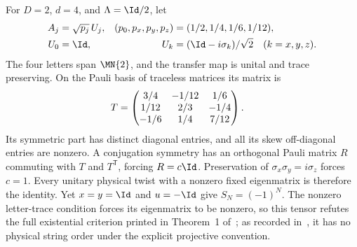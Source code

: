 \begin{example}
    \label{ex:string_order_scalar_phase_tensor}
    \leanok
    For $D=2$, $d=4$, and $\Lambda=\Id/2$, let
    \begin{align}
        A_j & =\sqrt{p_j}\,U_j,
            & (p_0,p_x,p_y,p_z) & =(1/2,1/4,1/6,1/12),\notag             \\
        U_0 & =\Id,
            & U_k               & =(\Id-i\sigma_k)/\sqrt2\quad(k=x,y,z).
        \notag
    \end{align}
    The four letters span $\MN{2}$, and the transfer map is unital and
    trace preserving. On the Pauli basis of traceless matrices its matrix is
    \begin{align}
        T & =\begin{pmatrix}
                 3/4  & -1/12 & 1/6  \\
                 1/12 & 2/3   & -1/4 \\
                 -1/6 & 1/4   & 7/12
             \end{pmatrix}.
        \notag
    \end{align}
    Its symmetric part has distinct diagonal entries, and all its skew
    off-diagonal entries are nonzero. A conjugation symmetry has an
    orthogonal Pauli matrix $R$ commuting with $T$ and $T^{\mathsf T}$,
    forcing $R=c\Id$. Preservation of
    $\sigma_x\sigma_y=i\sigma_z$ forces $c=1$.
    Every unitary physical twist with a nonzero fixed eigenmatrix is therefore
    the identity. Yet $x=y=\Id$ and $u=-\Id$ give $S_N=(-1)^N$.
    The nonzero letter-trace condition forces its eigenmatrix to be nonzero,
    so this tensor refutes the full existential criterion printed in
    Theorem~1 of~\cite{PerezGarcia2008StringOrder}; as recorded
    in~\cite{gap:pgwsvc08_string_order_scalar_phase}, it has no physical
    string order under the explicit projective convention.


\end{example}
